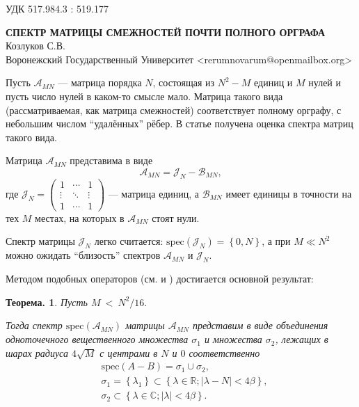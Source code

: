 \documentclass[11pt]{article}
\newtheorem{thm}{Теорема.}
\begin{document}
\setcounter{thm}{0}
\small{УДК 517.984.3 : 519.177}

\begin{center}
\textbf{СПЕКТР МАТРИЦЫ СМЕЖНОСТЕЙ ПОЧТИ ПОЛНОГО ОРГРАФА}\\
\small{Козлуков С.В.} \\
\small{Воронежский Государственный Университет}
\small{<rerumnovarum@openmailbox.org>} \\
\end{center}

Пусть \( \mathscr{A}_{MN} \) --- матрица порядка \( N \),
состоящая из \( N^2 - M \) единиц и \( M \) нулей
и пусть число нулей в каком-то смысле мало.
Матрица такого вида (рассматриваемая, как матрица смежностей) соответствует
полному орграфу, с небольшим числом ``удалённых'' рёбер.
В статье получена оценка спектра
матриц такого вида.

Матрица \( \mathscr{A}_{MN} \) представима в виде
\[
    \mathscr{A}_{MN} = \mathscr{J}_{N} - \mathscr{B}_{MN},
    \]
где \(
\mathscr{J}_{N} =
\begin{pmatrix}1 & \cdots & 1 \\
\vdots & \ddots & \vdots \\
1 & \cdots & 1
\end{pmatrix} \) --- матрица единиц,
а \( \mathscr{B}_{MN} \) имеет единицы в точности на тех \( M \)
местах, на которых в \( \mathscr{A}_{MN} \) стоят нули.

Спектр матрицы \( \mathscr{J}_{N} \) легко считается:
\( \mathrm{spec}\left({\mathscr{J}_{N}}\right) = \left\{0, N \right\} \),
а при \( M \ll N^2 \) можно ожидать ``близость'' спектров
\( \mathscr{A}_{MN} \) и \( \mathscr{J}_{N} \).

Методом подобных операторов (см. \cite{baskakov-harmonic} и \cite{baskakov-split})
достигается основной результат:
\begin{thm}\label{thm:almostallones-spectra}
    Пусть
    \(M~<~\displaystyle{N^2/16}. \)

    Тогда спектр \( \mathrm{spec}\left({\mathscr{A}_{MN}}\right) \)
    матрицы \( \mathscr{A}_{MN} \)
    представим в виде объединения
    одноточечного вещественного множества \( \sigma_1 \)
    и множества \( \sigma_2 \),
    лежащих в шарах радиуса \( 4\sqrt{M} \)
    с центрами в \( N \) и \( 0 \) соответственно
    \begin{equation}\begin{aligned}
        & \mathrm{spec}\left({A-B}\right) = \sigma_1 \cup \sigma_2, \\
        & \sigma_1 = \left\{ \lambda_1 \right\}
          \subset \left\{ \lambda\in\mathbb{R}; \lvert \lambda - N\rvert < 4\beta \right\}, \\
        & \sigma_2 \subset \left\{\lambda\in\mathbb{C}; \lvert\lambda\rvert <4\beta \right\}. \\
    \end{aligned}\end{equation}
\end{thm}
\end{document}
